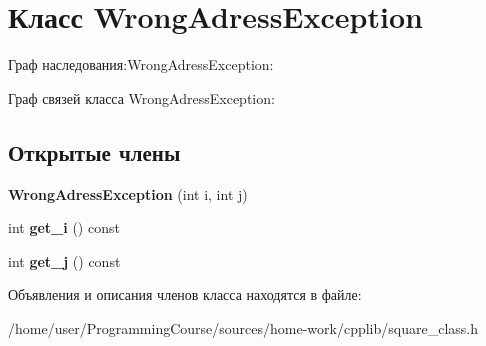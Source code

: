 \hypertarget{classWrongAdressException}{\section{Класс Wrong\+Adress\+Exception}
\label{classWrongAdressException}
}


Граф наследования\+:Wrong\+Adress\+Exception\+:


Граф связей класса Wrong\+Adress\+Exception\+:
\subsection*{Открытые члены}
\begin{DoxyCompactItemize}
\item 
\hypertarget{classWrongAdressException_aeab2bb91040801f2d5481b5b5a187290}{{\bfseries Wrong\+Adress\+Exception} (int i, int j)}\label{classWrongAdressException_aeab2bb91040801f2d5481b5b5a187290}

\item 
\hypertarget{classWrongAdressException_a58495dd6c035bc89e84dcd32c820d643}{int {\bfseries get\+\_\+i} () const }\label{classWrongAdressException_a58495dd6c035bc89e84dcd32c820d643}

\item 
\hypertarget{classWrongAdressException_af2aad78e06f89ac14ef150fe3879f7ec}{int {\bfseries get\+\_\+j} () const }\label{classWrongAdressException_af2aad78e06f89ac14ef150fe3879f7ec}

\end{DoxyCompactItemize}


Объявления и описания членов класса находятся в файле\+:\begin{DoxyCompactItemize}
\item 
/home/user/\+Programming\+Course/sources/home-\/work/cpplib/square\+\_\+class.\+h\end{DoxyCompactItemize}
